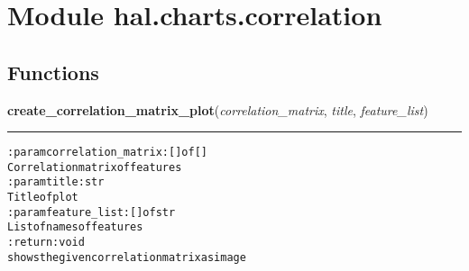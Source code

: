 %
%
%


\section{Module hal.charts.correlation}

    \label{hal:charts:correlation}


  \subsection{Functions}

    \label{hal:charts:correlation:create_correlation_matrix_plot}

    \vspace{0.5ex}

\hspace{.8\funcindent}\begin{boxedminipage}{\funcwidth}

    \raggedright \textbf{create\_correlation\_matrix\_plot}(\textit{correlation\_matrix}, \textit{title}, \textit{feature\_list})

    \vspace{-1.5ex}

    \rule{\textwidth}{0.5\fboxrule}
\setlength{\parskip}{2ex}
\begin{alltt}

:param correlation\_matrix: [] of []
    Correlation matrix of features
:param title: str
    Title of plot
:param feature\_list: [] of str
    List of names of features
:return: void
    shows the given correlation matrix as image
\end{alltt}

\setlength{\parskip}{1ex}
    \end{boxedminipage}

